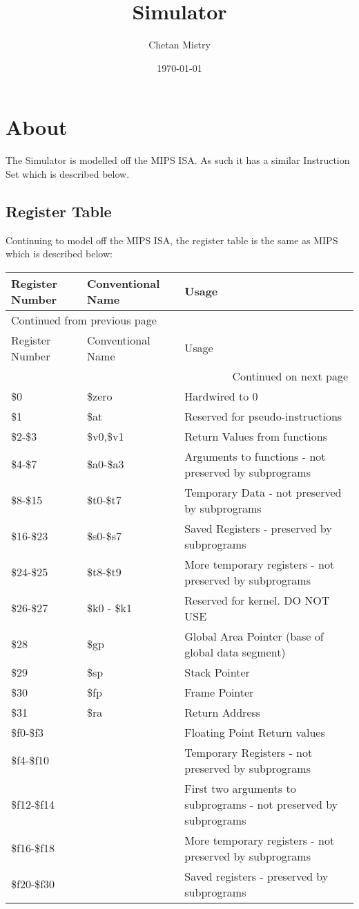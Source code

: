 \documentclass[11pt]{article}
\author{Chetan Mistry}
\date{\today}
\title{Simulator}
\begin{document}
\maketitle
\tableofcontents


\section{About}
\label{sec:org51572fe}
The Simulator is modelled off the MIPS ISA. As such it has a similar
Instruction Set which is described below.

\subsection{Register Table}
\label{sec:org3382755}
Continuing to model off the MIPS ISA, the register table is the same
as MIPS which is described below:

\begin{longtable}{p{1.5cm}|p{2cm}|p{10cm}}
Register Number & Conventional Name & Usage\\
\hline
\endfirsthead
\multicolumn{3}{l}{Continued from previous page} \\
\hline

Register Number & Conventional Name & Usage \\

\hline
\endhead
\hline\multicolumn{3}{r}{Continued on next page} \\
\endfoot
\endlastfoot
\hline
\$0 & \$zero & Hardwired to 0\\
\$1 & \$at & Reserved for pseudo-instructions\\
\$2-\$3 & \$v0,\$v1 & Return Values from functions\\
\$4-\$7 & \$a0-\$a3 & Arguments to functions - not preserved by subprograms\\
\$8-\$15 & \$t0-\$t7 & Temporary Data - not preserved by subprograms\\
\$16-\$23 & \$s0-\$s7 & Saved Registers - preserved by subprograms\\
\$24-\$25 & \$t8-\$t9 & More temporary registers - not preserved by subprograms\\
\$26-\$27 & \$k0 - \$k1 & Reserved for kernel. DO NOT USE\\
\$28 & \$gp & Global Area Pointer (base of global data segment)\\
\$29 & \$sp & Stack Pointer\\
\$30 & \$fp & Frame Pointer\\
\$31 & \$ra & Return Address\\
\$f0-\$f3 &  & Floating Point Return values\\
\$f4-\$f10 &  & Temporary Registers - not preserved by subprograms\\
\$f12-\$f14 &  & First two arguments to subprograms - not preserved by subprograms\\
\$f16-\$f18 &  & More temporary registers - not preserved by subprograms\\
\$f20-\$f30 &  & Saved registers - preserved by subprograms\\
\end{longtable}
\end{document}
